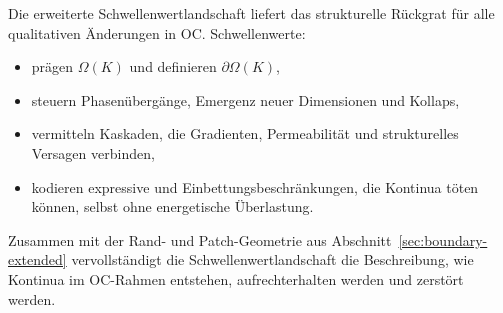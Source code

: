 Die erweiterte Schwellenwertlandschaft liefert das strukturelle Rückgrat für alle
qualitativen Änderungen in OC. Schwellenwerte:
\begin{itemize}
    \item prägen \(\Omega(K)\) und definieren \(\partial\Omega(K)\),
    \item steuern Phasenübergänge, Emergenz neuer Dimensionen und Kollaps,
    \item vermitteln Kaskaden, die Gradienten, Permeabilität und strukturelles Versagen verbinden,
    \item kodieren expressive und Einbettungsbeschränkungen, die Kontinua töten können,
          selbst ohne energetische Überlastung.
\end{itemize}

Zusammen mit der Rand- und Patch-Geometrie aus
Abschnitt~\ref{sec:boundary-extended} vervollständigt die Schwellenwertlandschaft die
Beschreibung, wie Kontinua im OC-Rahmen entstehen, aufrechterhalten werden und
zerstört werden.
